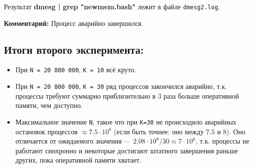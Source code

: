 \documentclass[10pt, a4paper]{article}
\begin{document}
Результат \textbf{dmesg | grep "newmem.bash" } лежит в файле \texttt{dmesg2.log}.

\textbf{Комментарий: }
Процесс аварийно завершился.

\subsection*{Итоги второго эксперимента: }
\begin{itemize}
    \item При \texttt{N = 20 800 000}, \texttt{K = 10} всё круто.
    \item При \texttt{N = 20 800 000}, \texttt{K = 30} ряд процессов закончился аварийно, т.к. процессы требуют суммарно приблизительно в 3 раза больше оперативной памяти, чем доступно.
    \item Максимальное значение \texttt{N}, такое что при \texttt{K=30} не происходило аварийных остановок процессов $\approx 7.5 \cdot 10^6$ (если быть точнее: оно между $7.5$ и $8$). Оно отличается от ожидаемого значения --- \(2.08\cdot 10^8 / 30 \approx 7\cdot 10^6\), т.к. процессы не работают синхронно и некоторые достигают штатного завершения раньше других, пока оперативной памяти хватает.
\end{itemize}
\end{document}
